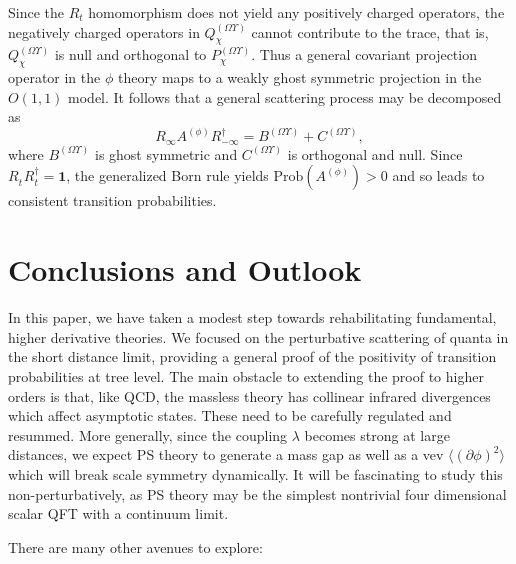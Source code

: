 \documentclass[pra,aps,amsmath,amssymb,notitlepage, twocolumn,superscriptaddress,longbibliography,nofootinbib,floatfix,10pt]{revtex4-2}
\begin{document}
Since the $R_t$ homomorphism does not yield any positively charged operators, the negatively charged operators in $Q_\chi^{(\Omega\Upsilon)}$ cannot contribute to the trace, that is, $Q_\chi^{(\Omega\Upsilon)}$ is null and orthogonal to $P_\chi^{(\Omega\Upsilon)}$. Thus a general covariant projection operator in the $\phi$ theory maps to a weakly ghost symmetric projection in the $O(1,1)$ model. It follows that a general scattering process may be decomposed as
\begin{equation}\label{eq:A_decomposition}
	R_{\infty}A^{(\phi)}R_{-\infty}^\dagger = B^{(\Omega\Upsilon)} + C^{(\Omega\Upsilon)},
\end{equation}
where $B^{(\Omega\Upsilon)}$ is ghost symmetric and $C^{(\Omega\Upsilon)}$ is orthogonal and null. Since $R_t^{\phantom{\dagger}}R_t^\dagger=\mathbf{1}$, the generalized Born rule yields  $\text{Prob}(A^{(\phi)})>0$ and so leads to consistent transition probabilities.




    
    



\section{Conclusions and Outlook}

In this paper, we have taken a modest step towards rehabilitating fundamental, higher derivative theories. We focused on the perturbative scattering of quanta in the short distance limit, providing a general proof of the positivity of transition probabilities at tree level. The main obstacle to extending the proof to higher orders is that, like QCD, the massless theory has collinear infrared divergences which affect asymptotic states. These need to be carefully regulated and resummed. More generally, since the coupling $\lambda$ becomes strong at large distances, we expect PS theory to generate a mass gap as well as a vev $\langle (\partial \phi)^2 \rangle$ which will break scale symmetry dynamically. It will be fascinating to study this non-perturbatively, as PS theory may be the simplest nontrivial four dimensional scalar QFT with a continuum limit. 

There are many other avenues to explore:
\end{document}
